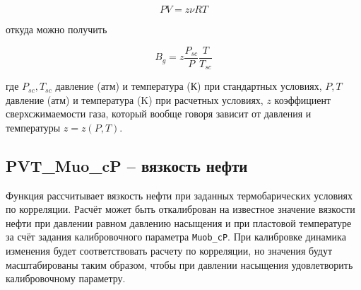 \documentclass[]{scrreprt}
\begin{document}
$$ PV = z \nu RT  $$

откуда можно получить 

$$ B_g = z \frac{P_{sc}}{P} \frac{T}{T_{sc}} $$

где $P_{sc}, T_{sc}$ давление (атм) и температура (К) при стандартных условиях, $P,T$ давление (атм) и температура (K) при расчетных условиях, $z$ коэффициент сверхсжимаемости газа, который вообще говоря зависит от давления и температуры $z = z(P,T)$. 


\newcommand{\DataFile}{data/Bg_P_data.txt}


\subsection{PVT\_Muo\_cP – вязкость нефти}
Функция рассчитывает вязкость нефти при заданных термобарических условиях по корреляции. Расчёт может быть откалиброван на известное значение вязкости нефти при давлении равном давлению насыщения и при пластовой температуре за счёт задания калибровочного параметра \texttt{Muob_cP}. При калибровке динамика изменения будет соответствовать расчету по корреляции, но значения будут масштабированы таким образом, чтобы при давлении насыщения удовлетворить калибровочному параметру.
\end{document}
